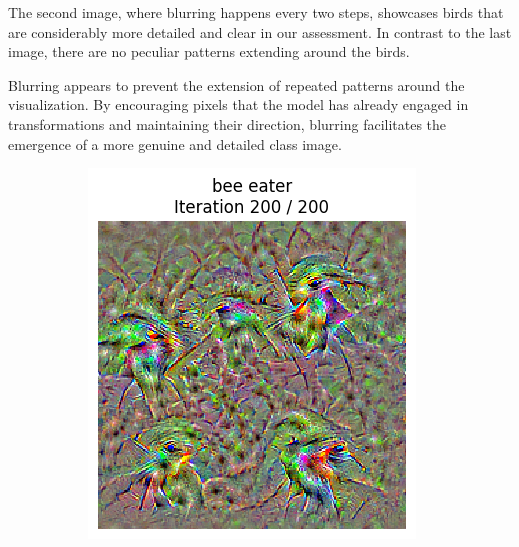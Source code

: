 The second image, where blurring happens every two steps, showcases birds that are considerably more detailed and clear in our assessment. In contrast to the last image, there are no peculiar patterns extending around the birds.

Blurring appears to prevent the extension of repeated patterns around the visualization. By encouraging pixels that the model has already engaged in transformations and maintaining their direction, blurring facilitates the emergence of a more genuine and detailed class image.

\begin{figure}[H]
    \centering
    \begin{subfigure}[t]{.33\textwidth}
        \centering
        \includegraphics[width=\linewidth]{figs_propre2/SqueezeNet/SqueezeNet_bird_animated_last_frame.png}
        \caption{}
        \label{fig:class_viz_blur:sub1}
    \end{subfigure}%
    \begin{subfigure}[t]{.33\textwidth}
        \centering

\end{subfigure}
\end{figure}
